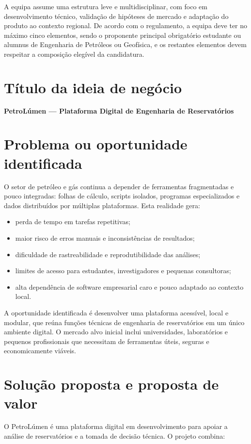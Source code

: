 \documentclass[11pt,a4paper]{article}
\begin{document}
A equipa assume uma estrutura leve e multidisciplinar, com foco em desenvolvimento técnico, validação de hipóteses de mercado e adaptação do produto ao contexto regional. De acordo com o regulamento, a equipa deve ter no máximo cinco elementos, sendo o proponente principal obrigatório estudante ou alumnus de Engenharia de Petróleos ou Geofísica, e os restantes elementos devem respeitar a composição elegível da candidatura.

\section{Título da ideia de negócio}
\textbf{PetroLúmen — Plataforma Digital de Engenharia de Reservatórios}

\section{Problema ou oportunidade identificada}
O setor de petróleo e gás continua a depender de ferramentas fragmentadas e pouco integradas: folhas de cálculo, scripts isolados, programas especializados e dados distribuídos por múltiplas plataformas. Esta realidade gera:

\begin{itemize}
    \item perda de tempo em tarefas repetitivas;
    \item maior risco de erros manuais e inconsistências de resultados;
    \item dificuldade de rastreabilidade e reprodutibilidade das análises;
    \item limites de acesso para estudantes, investigadores e pequenas consultoras;
    \item alta dependência de software empresarial caro e pouco adaptado ao contexto local.
\end{itemize}

A oportunidade identificada é desenvolver uma plataforma acessível, local e modular, que reúna funções técnicas de engenharia de reservatórios em um único ambiente digital. O mercado alvo inicial inclui universidades, laboratórios e pequenos profissionais que necessitam de ferramentas úteis, seguras e economicamente viáveis.

\section{Solução proposta e proposta de valor}
O PetroLúmen é uma plataforma digital em desenvolvimento para apoiar a análise de reservatórios e a tomada de decisão técnica. O projeto combina:
\end{document}
